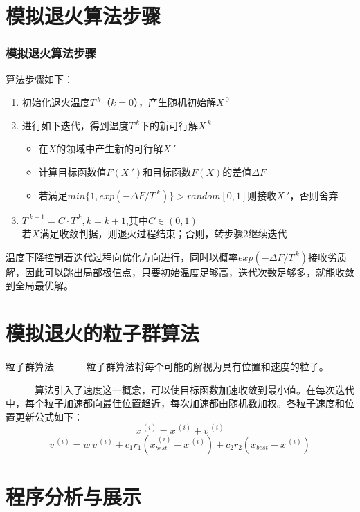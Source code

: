 \documentclass{beamer}
\begin{document}
	\section{模拟退火算法步骤}
	
	\begin{frame}
		\frametitle{模拟退火算法步骤}
		算法步骤如下：
		\begin{enumerate}
			\item 初始化退火温度$T^{~k}$（$k = 0$），产生随机初始解$X^{~0}$
			\item 进行如下迭代，得到温度$T^{~k}$下的新可行解$X^{~k}$
			\begin{itemize}
				\item 在$X$的领域中产生新的可行解$X~'$
				\item 计算目标函数值$F(X~')$和目标函数$F(X)$的差值$\Delta F$
				\item 若满足$min \{1, exp(- \Delta F / T^{~k}) \} > random [0, 1]$则接收$X~'$，否则舍弃
			\end{itemize}
			\item $T^{~k+1} =C \cdot T^{~k}, k = k + 1$,其中$C \in (0, 1)$\\若$X$满足收敛判据，则退火过程结束；否则，转步骤2继续迭代
		\end{enumerate}
		温度下降控制着迭代过程向优化方向进行，同时以概率$exp(- \Delta F / T^{~k})$接收劣质解，因此可以跳出局部极值点，只要初始温度足够高，迭代次数足够多，就能收敛到全局最优解。
	\end{frame}
	
	\section{模拟退火的粒子群算法}
	\begin{frame}
		\begin{block}{粒子群算法}
			~~~~~~粒子群算法将每个可能的解视为具有位置和速度的粒子。\cite{b2}
		\end{block}
		~~~~~~算法引入了速度这一概念，可以使目标函数加速收敛到最小值。在每次迭代中，每个粒子加速都向最佳位置趋近，每次加速都由随机数加权。\cite{b3}各粒子速度和位置更新公式如下：
		$$x^{~(i)} = x^{~(i)} + v^{~(i)}$$
		$$v^{~(i)} = w~v^{~(i)} + c_1 r_1 (x^{~(i)}_{best} − x^{~(i)}) + c_2 r_2 (x_{best} − x^{~(i)})$$
	\end{frame}
	\section{程序分析与展示}
	
\end{document}

